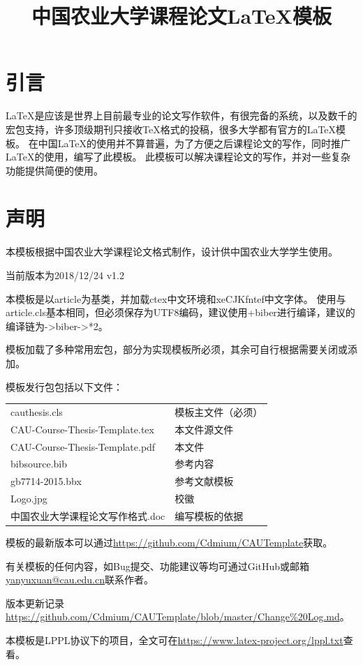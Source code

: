 \documentclass[twoside,maketable]{cauthesis}
\title{中国农业大学课程论文\LaTeX{}模板}%
\date{}%
\author{}%
\begin{document}
\section{引言}
	\LaTeX{}是应该是世界上目前最专业的论文写作软件，有很完备的系统，以及数千的宏包支持，许多顶级期刊只接收\TeX{}格式的投稿，很多大学都有官方的\LaTeX{}模板。
	在中国\LaTeX{}的使用并不算普遍，为了方便之后课程论文的写作，同时推广\LaTeX{}的使用，编写了此模板。
	此模板可以解决课程论文的写作，并对一些复杂功能提供简便的使用。
\section{声明}
	本模板根据中国农业大学课程论文格式制作，设计供中国农业大学学生使用。

	当前版本为2018/12/24 v1.2

	本模板是以article为基类，并加载ctex中文环境和xeCJKfntef中文字体。
	使用与article.cls基本相同，但必须保存为UTF8编码，建议使用\XeLaTeX{}+biber进行编译，建议的编译链为\XeLaTeX{}->biber->\XeLaTeX{}*2。

	模板加载了多种常用宏包，部分为实现模板所必须，其余可自行根据需要关闭或添加。

	模板发行包包括以下文件：

	\begin{table}[H]
		\begin{tabular}{ll}
			cauthesis.cls                    & 模板主文件（必须） \\
			CAU-Course-Thesis-Template.tex   & 本文件源文件       \\
			CAU-Course-Thesis-Template.pdf   & 本文件             \\
			bibsource.bib                    & 参考内容           \\
			gb7714-2015.bbx                  & 参考文献模板       \\
			Logo.jpg                         & 校徽               \\
			中国农业大学课程论文写作格式.doc & 编写模板的依据
		\end{tabular}
	\end{table}

	模板的最新版本可以通过\url{https://github.com/Cdmium/CAUTemplate}获取。

	有关模板的任何内容，如Bug提交、功能建议等均可通过GitHub或邮箱\url{yanyuxuan@cau.edu.cn}联系作者。

	版本更新记录\url{https://github.com/Cdmium/CAUTemplate/blob/master/Change%20Log.md}。

	本模板是LPPL协议下的项目，全文可在\url{https://www.latex-project.org/lppl.txt}查看。
\end{document}
